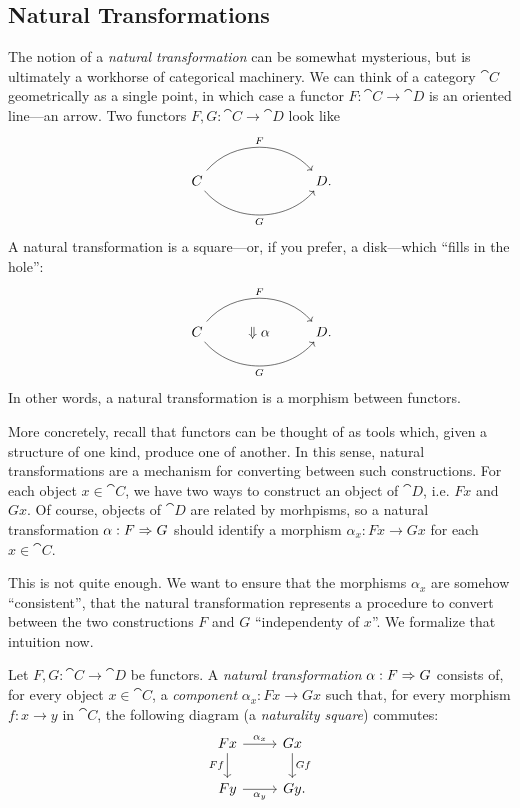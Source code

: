 
\subsection{Natural Transformations}

The notion of a \emph{natural transformation} can be somewhat mysterious, but is
ultimately a workhorse of categorical machinery. We can think of a category
$\cat{C}$ geometrically as a single point, in which case a functor $F:
\cat{C}\to\cat{D}$ is an oriented line---an arrow. Two functors $F,G:
\cat{C}\to\cat{D}$ look like \[
  \begin{tikzcd}
    C \ar[rr, "F", bend left=50]\ar[rr, "G"', bend right=50] & \phantom{\Downarrow\alpha} & D\punctuation{.}
  \end{tikzcd}
\]
A natural transformation is a square---or, if you prefer, a disk---which ``fills
in the hole'': \[
  \begin{tikzcd}
    C \ar[rr, "F", bend left=50]\ar[rr, "G"', bend right=50] & \Downarrow\alpha& D\punctuation{.}
  \end{tikzcd}
\]
In other words, a natural transformation is a morphism between functors.

More concretely, recall that functors can be thought of as tools which, given a
structure of one kind, produce one of another. In this sense, natural
transformations are a mechanism for converting between such constructions. For
each object $x\in\cat{C}$, we have two ways to construct an object of $\cat{D}$,
i.e. $Fx$ and $Gx$. Of course, objects of $\cat{D}$ are related by morhpisms, so
a natural transformation $\alpha: F\Rightarrow G$ should identify a morphism $\alpha_x:
Fx\to Gx$ for each $x\in\cat{C}$.

This is not quite enough. We want to ensure that the morphisms $\alpha_x$ are
somehow ``consistent'', that the natural transformation represents a procedure to
convert between the two constructions $F$ and $G$ ``independenty of $x$''. We
formalize that intuition now.

\begin{dfn}\label{def:natural transformation}
  Let $F, G: \cat{C}\to\cat{D}$ be functors. A \emph{natural transformation}
  $\alpha: F\Rightarrow G$ consists of, for every object $x\in\cat{C}$, a
  \emph{component} $\alpha_x: Fx\to Gx$ such that, for every morphism $f: x\to
  y$ in $\cat{C}$, the following diagram (a \emph{naturality square}) commutes:
  \[
    \begin{tikzcd}
      Fx\ar[r, "\alpha_x"]\ar[d, "Ff"'] & Gx\ar[d, "Gf"] \\
      Fy\ar[r, "\alpha_y"'] & Gy\punctuation{.}
    \end{tikzcd}
  \]
\end{dfn}

